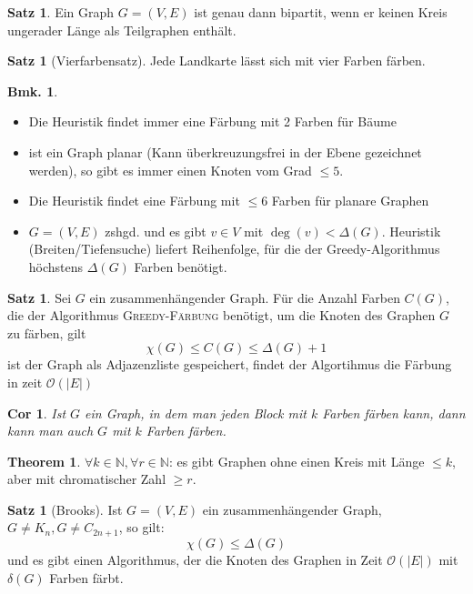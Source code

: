 \documentclass[a4paper, 10pt]{article}
\newtheorem*{corollary}{Cor}
\theoremstyle{definition}
\newtheorem{theorem}[definition]{Satz}
\newtheorem*{note}{Bmk.}
\newtheorem*{theorem*}{Theorem}
\theoremstyle{named}
\newcommand{\N}{\mathbb{N}}
\newcommand{\BO}{\mathcal{O}}
\begin{document}
\setcounter{definition}{57}
\begin{theorem}
    Ein Graph $G = (V, E)$ ist genau dann bipartit, wenn er keinen Kreis ungerader Länge als Teilgraphen enthält.
\end{theorem}

\begin{theorem}[Vierfarbensatz]
    Jede Landkarte lässt sich mit vier Farben färben.
\end{theorem}

\begin{note}
    \begin{itemize}
        \item Die Heuristik findet immer eine Färbung mit 2 Farben für Bäume
        \item ist ein Graph planar (Kann überkreuzungsfrei in der Ebene gezeichnet werden), so gibt es immer einen Knoten vom Grad $\leq 5$.
        \item Die Heuristik findet eine Färbung mit $\leq 6$ Farben für planare Graphen
        \item $G = (V, E)$ zshgd. und es gibt $v \in V$ mit $\deg(v) < \Delta(G)$. Heuristik (Breiten/Tiefensuche) liefert Reihenfolge, für die der Greedy-Algorithmus höchstens $\Delta(G)$ Farben benötigt.
    \end{itemize}
\end{note}

\begin{theorem}
    Sei $G$ ein zusammenhängender Graph. Für die Anzahl Farben $C(G)$, die der Algorithmus \textsc{Greedy-Färbung} benötigt, um die Knoten des Graphen $G$ zu färben, gilt
    $$\chi(G) \leq C(G) \leq \Delta(G) + 1$$
    ist der Graph als Adjazenzliste gespeichert, findet der Algortihmus die Färbung in zeit $\BO(|E|)$
\end{theorem}

\begin{corollary}
    Ist $G$ ein Graph, in dem man jeden Block mit $k$ Farben färben kann, dann kann man auch $G$ mit $k$ Farben färben.
\end{corollary}

\begin{theorem*}
    $\forall k \in \N, \forall r \in \N$: es gibt Graphen ohne einen Kreis mit Länge $\leq k$, aber mit chromatischer Zahl $\geq r$.
\end{theorem*}

\setcounter{definition}{63}
\begin{theorem}[Brooks]
    Ist $G = (V, E)$ ein zusammenhängender Graph, $G \neq K_n, G \neq C_{2n + 1}$, so gilt:
    $$\chi(G) \leq \Delta(G)$$
    und es gibt einen Algorithmus, der die Knoten des Graphen in Zeit $\BO(|E|)$ mit $\delta(G)$ Farben färbt.
\end{theorem}
\end{document}
